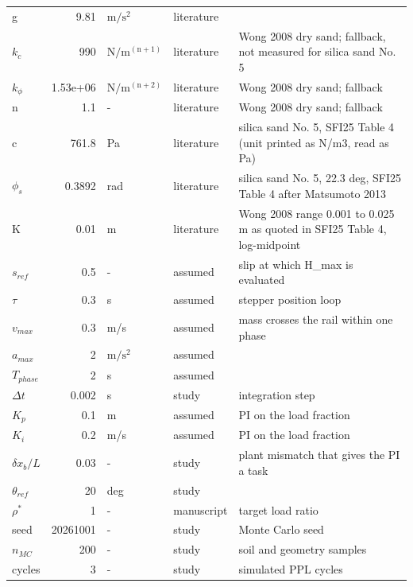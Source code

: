 \begin{table}[!ht]
\begin{tabularx}{\linewidth}{@{}l r l l X@{}}
g & 9.81 & $\mathrm{m/s^2}$ & literature &  \\
$k_c$ & 990 & $\mathrm{N/m^(n+1)}$ & literature & Wong 2008 dry sand; fallback, not measured for silica sand No. 5 \\
$k_\phi$ & 1.53e+06 & $\mathrm{N/m^(n+2)}$ & literature & Wong 2008 dry sand; fallback \\
n & 1.1 & - & literature & Wong 2008 dry sand; fallback \\
c & 761.8 & Pa & literature & silica sand No. 5, SFI25 Table 4 (unit printed as N/m3, read as Pa) \\
$\phi_s$ & 0.3892 & rad & literature & silica sand No. 5, 22.3 deg, SFI25 Table 4 after Matsumoto 2013 \\
K & 0.01 & m & literature & Wong 2008 range 0.001 to 0.025 m as quoted in SFI25 Table 4, log-midpoint \\
$s_{ref}$ & 0.5 & - & assumed & slip at which H\_max is evaluated \\
$\tau$ & 0.3 & s & assumed & stepper position loop \\
$v_{max}$ & 0.3 & m/s & assumed & mass crosses the rail within one phase \\
$a_{max}$ & 2 & $\mathrm{m/s^2}$ & assumed &  \\
$T_{phase}$ & 2 & s & assumed &  \\
$\Delta t$ & 0.002 & s & study & integration step \\
$K_p$ & 0.1 & m & assumed & PI on the load fraction \\
$K_i$ & 0.2 & m/s & assumed & PI on the load fraction \\
$\delta x_b/L$ & 0.03 & - & study & plant mismatch that gives the PI a task \\
$\theta_{ref}$ & 20 & deg & study &  \\
$\rho^\ast$ & 1 & - & manuscript & target load ratio \\
seed & 20261001 & - & study & Monte Carlo seed \\
$n_{MC}$ & 200 & - & study & soil and geometry samples \\
cycles & 3 & - & study & simulated PPL cycles \\
\bottomrule
\end{tabularx}
\end{table}
